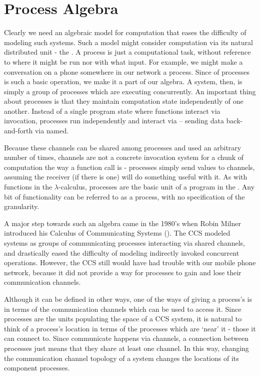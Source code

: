 \section{Process Algebra}
Clearly we need an algebraic model for computation that eases the difficulty of modeling such systems.  
Such a model might consider computation via its natural distributed unit - the . 
A process is just a computational task, without reference to where it might be run nor with what input.  
For example, we might make a conversation on a phone somewhere in our network a process. 
Since  of processes is such a basic operation, we make it a part of our algebra.  
A system, then, is simply a group of processes which are executing concurrently. 
An important thing about processes is that they maintain computation state independently of one another.  
Instead of a single program state where functions interact via invocation, processes run independently and interact via  -- sending data back-and-forth via named.  

Because these channels can be shared among processes and used an arbitrary number of times, channels are not a concrete invocation system for a chunk of computation the way a function call is - processes simply send values to channels, assuming the receiver (if there is one) will do something useful with it.  
As with functions in the $\lambda$-calculus, processes are the basic unit of a program in the \picalc. 
Any bit of functionality can be referred to as a process, with no specification of the granularity.

A major step towards such an algebra came in the 1980's when Robin Milner introduced his Calculus of Communicating Systems (\!).  
 The CCS modeled systems as groups of communicating processes interacting via shared channels, and drastically eased the difficulty of modeling indirectly invoked concurrent operations.  
However, the CCS still would have had trouble with our mobile phone network, because it did not provide a way for processes to gain and lose their communication channels.

	Although it can be defined in other ways, one of the ways of giving a process's\emph{} is in terms of the communication channels which can be used to access it.  
Since processes are the units populating the space of a CCS system, it is natural to think of a process's location in terms of the processes which are `near' it - those it can connect to.  
Since communicate happens via channels, a connection between processes just means that they share at least one channel.  
In this way, changing the communication channel topology of a system changes the locations of its component processes.  

